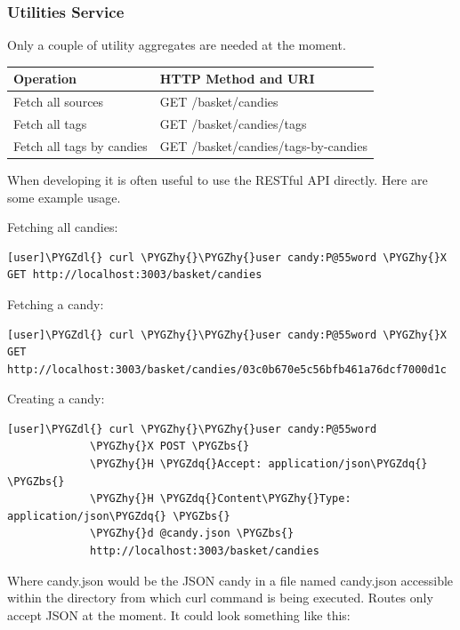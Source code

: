 \documentclass[letterpaper,10pt,english]{sphinxmanual}
\def\PYGZbs{\char`\\}
\def\PYGZdl{\char`\$}
\def\PYGZhy{\char`\-}
\def\PYGZdq{\char`\"}
\begin{document}
\subsubsection{Utilities Service}
\label{developer-guide:utilities-service}
Only a couple of utility aggregates are needed at the moment.

\begin{tabulary}{\linewidth}{|L|L|}
\hline
\textsf{\relax 
Operation
} & \textsf{\relax 
HTTP Method and URI
}\\
\hline
Fetch all sources
 & 
GET /basket/candies
\\

Fetch all tags
 & 
GET /basket/candies/tags
\\

Fetch all tags by candies
 & 
GET /basket/candies/tags-by-candies
\\
\hline\end{tabulary}


When developing it is often useful to use the RESTful API
directly. Here are some example usage.

Fetching all candies:

\begin{Verbatim}[commandchars=\\\{\}]
[user]\PYGZdl{} curl \PYGZhy{}\PYGZhy{}user candy:P@55word \PYGZhy{}X GET http://localhost:3003/basket/candies
\end{Verbatim}

Fetching a candy:

\begin{Verbatim}[commandchars=\\\{\}]
[user]\PYGZdl{} curl \PYGZhy{}\PYGZhy{}user candy:P@55word \PYGZhy{}X GET http://localhost:3003/basket/candies/03c0b670e5c56bfb461a76dcf7000d1c
\end{Verbatim}

Creating a candy:

\begin{Verbatim}[commandchars=\\\{\}]
[user]\PYGZdl{} curl \PYGZhy{}\PYGZhy{}user candy:P@55word
             \PYGZhy{}X POST \PYGZbs{}
             \PYGZhy{}H \PYGZdq{}Accept: application/json\PYGZdq{}  \PYGZbs{}
             \PYGZhy{}H \PYGZdq{}Content\PYGZhy{}Type: application/json\PYGZdq{} \PYGZbs{}
             \PYGZhy{}d @candy.json \PYGZbs{}
             http://localhost:3003/basket/candies
\end{Verbatim}

Where candy.json would be the JSON candy in a file named candy.json
accessible within the directory from which curl command is being
executed. Routes only accept JSON at the moment.  It could look
something like this:
\end{document}
